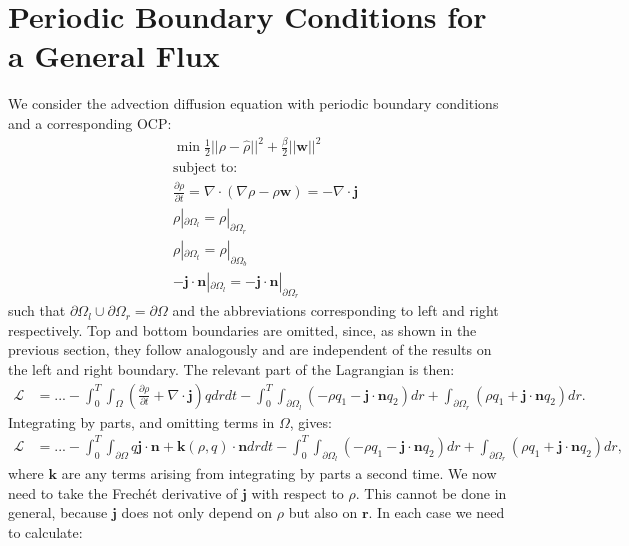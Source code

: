 \documentclass[11pt, a4paper]{article}
\theoremstyle{definition}
\newcommand{\w}{\mathbf{w}}
\newcommand{\n}{\mathbf{n}}
\newcommand{\hr}{\widehat \rho}
\newcommand{\jf}{\mathbf j}
\begin{document}
	
		
	\section{Periodic Boundary Conditions for a General Flux}
	
	We consider the advection diffusion equation with periodic boundary conditions and a corresponding OCP:
	\begin{align*}
		&\min \frac{1}{2}|| \rho - \hr||^2 + \frac{\beta}{2}||\w||^2\\
		&\text{subject to:}\\
		&\frac{\partial \rho}{\partial t} = \nabla \cdot \left(\nabla \rho - \rho \w\right) = -\nabla \cdot \jf\\
		& \rho|_{\partial \Omega_l} = \rho|_{\partial \Omega_r}\\
		& \rho|_{\partial \Omega_t} = \rho|_{\partial \Omega_b}\\
		& - \jf \cdot \n |_{\partial \Omega_l}= - \jf \cdot \n|_{\partial \Omega_r}
	\end{align*}
	such that $\partial\Omega_l \cup \partial\Omega_r = \partial \Omega$ and the abbreviations corresponding to left and right respectively. Top and bottom boundaries are omitted, since, as shown in the previous section, they follow analogously and are independent of the results on the left and right boundary.
	The relevant part of the Lagrangian is then:
	\begin{align*}
		\mathcal{L} &= ... -\int_0^T \int_\Omega \left(\frac{\partial \rho}{\partial t} + \nabla \cdot \jf\right)q dr dt - \int_0^T \int_{\partial \Omega_l} \left(- \rho q_1 - \jf \cdot \n q_2 \right) dr  + \int_{\partial \Omega_r} \left(\rho q_1 +  \jf \cdot \n q_2  \right)  dr .
	\end{align*}
	Integrating by parts, and omitting terms in $\Omega$, gives:
	\begin{align*}
		\mathcal{L} &= ... - \int_0^T \int_{\partial \Omega} q \jf  \cdot \n + \mathbf{k}(\rho, q) \cdot \n  dr dt - \int_0^T \int_{\partial \Omega_l} \left(- \rho q_1 - \jf \cdot \n q_2 \right)   dr  + \int_{\partial \Omega_r} \left(\rho q_1 + \jf \cdot \n q_2 \right)   dr, 
	\end{align*}
	where $\mathbf{k}$ are any terms arising from integrating by parts a second time.
	We now need to take the Frech\'et derivative of $\jf$ with respect to $\rho$. This cannot be done in general, because $\jf$ does not only depend on $\rho$ but also on $\mathbf r$. In each case we need to calculate:
\end{document}
